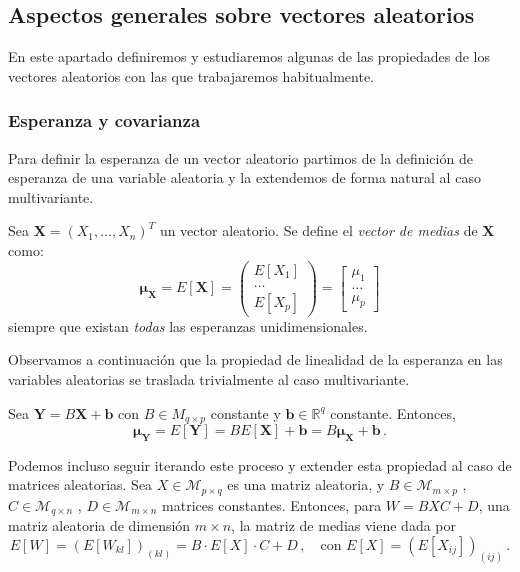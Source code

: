 \subsection{Aspectos generales sobre vectores aleatorios}

En este apartado definiremos y estudiaremos algunas de las propiedades de los vectores aleatorios con las que trabajaremos habitualmente.

\subsubsection{Esperanza y covarianza}

Para definir la esperanza de un vector aleatorio partimos de la definición de esperanza de una variable aleatoria y la extendemos de forma natural al caso multivariante.

\begin{ndef}
  Sea $\boldsymbol X=(X_1,\dots,X_n)^T$ un vector aleatorio. Se define el \emph{vector de medias} de $\boldsymbol X$ como:
  \[
  \boldsymbol \mu_{\boldsymbol X} = E[\boldsymbol X] = \begin{pmatrix}  E[X_1] \\ \dots \\ E[X_p] \end{pmatrix} = \begin{bmatrix} \mu_1 \\ \dots \\ \mu_p \end{bmatrix}
  \]
  siempre que existan \emph{todas} las esperanzas unidimensionales.
  \end{ndef}

  Observamos a continuación que la propiedad de linealidad de la esperanza en las variables aleatorias se traslada trivialmente al caso multivariante.

\begin{nprop}
  Sea $\boldsymbol Y = B\boldsymbol X + \boldsymbol b$ con $B \in M_{q\times p}$ constante y $\boldsymbol b \in \mathbb R^q$ constante. Entonces,
  \[
    \boldsymbol \mu_{\boldsymbol Y} = E[\boldsymbol Y] = BE[\boldsymbol X] + \boldsymbol b = B\boldsymbol \mu_{\boldsymbol X} + \boldsymbol b\,.
\]
\end{nprop}

Podemos incluso seguir iterando este proceso y extender esta propiedad al caso de matrices aleatorias. Sea $X\in \mathcal M_{p\times q}$ es una matriz aleatoria, y $B\in \mathcal M_{m\times p}$ , $C \in \mathcal M_{q\times n}$ , $D \in \mathcal M_{m \times n}$ matrices constantes. Entonces, para $W = BXC + D$, una matriz aleatoria de dimensión $m\times n$, la matriz de medias viene dada por
\[
E[W] = \left(E[W_{kl}]\right)_{(kl)} = B \cdot E[X] \cdot C + D\,, \quad \text{con } E[X] = \left(E[X_{ij}]\right)_{(ij)}\,.
\]

